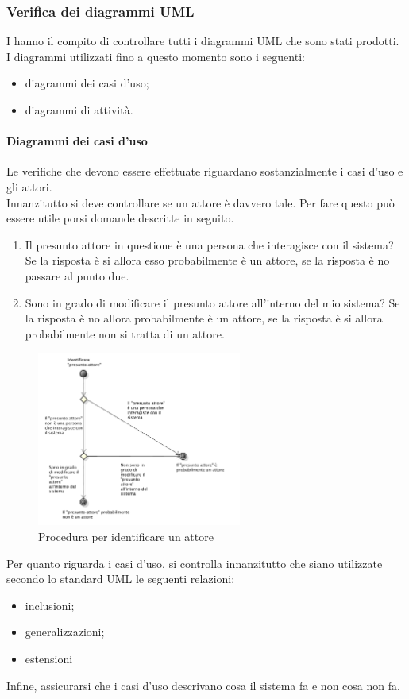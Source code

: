 		\subsubsection{Verifica dei diagrammi UML}
			I  hanno il compito di controllare tutti i diagrammi UML che sono stati prodotti. I diagrammi utilizzati fino a questo momento 
			sono i seguenti:
			\begin{itemize}
				\item diagrammi dei casi d'uso;
				\item diagrammi di attività.
			\end{itemize}
			\paragraph{Diagrammi dei casi d'uso}
				Le verifiche che devono essere effettuate riguardano sostanzialmente i casi d'uso e gli attori.\\
				Innanzitutto si deve controllare se un attore è davvero tale. Per fare questo può essere utile porsi domande descritte in seguito.
				\begin{enumerate}
					\item Il presunto attore in questione è una persona che interagisce con il sistema? Se la risposta è si allora esso probabilmente è un attore, se la risposta è no passare al punto due.
					\item Sono in grado di modificare il presunto attore all'interno del mio sistema? Se la risposta è no allora probabilmente è un attore, se la risposta è si allora probabilmente non si tratta di un attore.
				\end{enumerate}
				\begin{figure}[H]
					\centering
					\includegraphics[width=0.6\textwidth]{NormeDiProgetto/Pics/VerificaAttori}
					\caption{Procedura per identificare un attore}
				\end{figure}
				Per quanto riguarda i casi d'uso, si controlla innanzitutto che siano utilizzate secondo lo standard UML le seguenti relazioni:
				\begin{itemize}
					\item inclusioni;
					\item generalizzazioni;
					\item estensioni
				\end{itemize}
				Infine, assicurarsi che i casi d'uso descrivano cosa il sistema fa e non cosa non fa.
